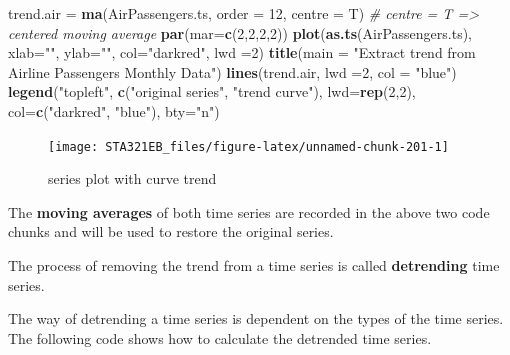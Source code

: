 \documentclass[
]{book}
\newenvironment{Shaded}{\begin{snugshade}}{\end{snugshade}}
\newcommand{\AttributeTok}[1]{\textcolor[rgb]{0.13,0.29,0.53}{#1}}
\newcommand{\CommentTok}[1]{\textcolor[rgb]{0.56,0.35,0.01}{\textit{#1}}}
\newcommand{\DecValTok}[1]{\textcolor[rgb]{0.00,0.00,0.81}{#1}}
\newcommand{\FunctionTok}[1]{\textcolor[rgb]{0.13,0.29,0.53}{\textbf{#1}}}
\newcommand{\NormalTok}[1]{#1}
\newcommand{\OtherTok}[1]{\textcolor[rgb]{0.56,0.35,0.01}{#1}}
\newcommand{\StringTok}[1]{\textcolor[rgb]{0.31,0.60,0.02}{#1}}
\begin{document}
\begin{Shaded}
\begin{Highlighting}[]
\NormalTok{trend.air }\OtherTok{=} \FunctionTok{ma}\NormalTok{(AirPassengers.ts, }\AttributeTok{order =} \DecValTok{12}\NormalTok{, }\AttributeTok{centre =}\NormalTok{ T)  }\CommentTok{\# centre = T =\textgreater{} centered moving average}
\FunctionTok{par}\NormalTok{(}\AttributeTok{mar=}\FunctionTok{c}\NormalTok{(}\DecValTok{2}\NormalTok{,}\DecValTok{2}\NormalTok{,}\DecValTok{2}\NormalTok{,}\DecValTok{2}\NormalTok{))}
\FunctionTok{plot}\NormalTok{(}\FunctionTok{as.ts}\NormalTok{(AirPassengers.ts), }\AttributeTok{xlab=}\StringTok{""}\NormalTok{, }\AttributeTok{ylab=}\StringTok{""}\NormalTok{, }\AttributeTok{col=}\StringTok{"darkred"}\NormalTok{, }\AttributeTok{lwd =}\DecValTok{2}\NormalTok{)}
\FunctionTok{title}\NormalTok{(}\AttributeTok{main =} \StringTok{"Extract trend from Airline Passengers Monthly Data"}\NormalTok{)}
\FunctionTok{lines}\NormalTok{(trend.air, }\AttributeTok{lwd =}\DecValTok{2}\NormalTok{, }\AttributeTok{col =} \StringTok{"blue"}\NormalTok{)}
\FunctionTok{legend}\NormalTok{(}\StringTok{"topleft"}\NormalTok{, }\FunctionTok{c}\NormalTok{(}\StringTok{"original series"}\NormalTok{, }\StringTok{"trend curve"}\NormalTok{), }\AttributeTok{lwd=}\FunctionTok{rep}\NormalTok{(}\DecValTok{2}\NormalTok{,}\DecValTok{2}\NormalTok{),}
       \AttributeTok{col=}\FunctionTok{c}\NormalTok{(}\StringTok{"darkred"}\NormalTok{, }\StringTok{"blue"}\NormalTok{), }\AttributeTok{bty=}\StringTok{"n"}\NormalTok{)}
\end{Highlighting}
\end{Shaded}

\begin{figure}

{\centering \texttt{[image: STA321EB\_files/figure-latex/unnamed-chunk-201-1]} 

}

\caption{series plot with curve trend}\label{fig:unnamed-chunk-201}
\end{figure}

The \textbf{moving averages} of both time series are recorded in the above two code chunks and will be used to restore the original series.

The process of removing the trend from a time series is called \textbf{detrending} time series.

The way of detrending a time series is dependent on the types of the time series. The following code shows how to calculate the detrended time series.
\end{document}
